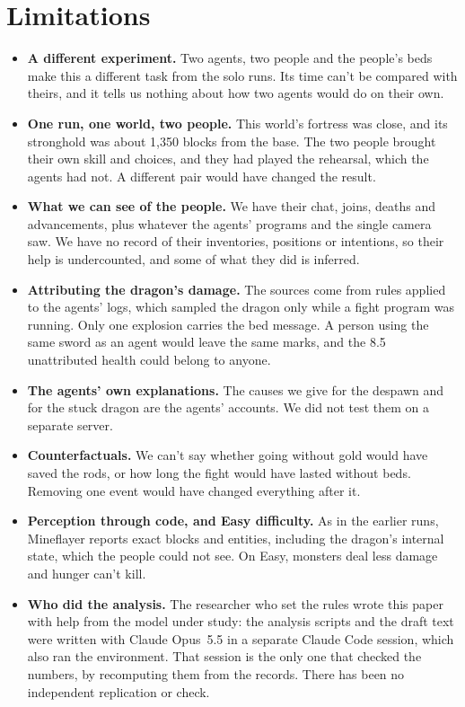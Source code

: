 \documentclass[11pt,a4paper]{article}
\begin{document}
\section{Limitations}
\label{sec:limits}

\begin{itemize}
  \item \textbf{A different experiment.} Two agents, two people and the people's beds make this a different task from the solo runs. Its time can't be compared with theirs, and it tells us nothing about how two agents would do on their own.
  \item \textbf{One run, one world, two people.} This world's fortress was close, and its stronghold was about 1,350 blocks from the base. The two people brought their own skill and choices, and they had played the rehearsal, which the agents had not. A different pair would have changed the result.
  \item \textbf{What we can see of the people.} We have their chat, joins, deaths and advancements, plus whatever the agents' programs and the single camera saw. We have no record of their inventories, positions or intentions, so their help is undercounted, and some of what they did is inferred.
  \item \textbf{Attributing the dragon's damage.} The sources come from rules applied to the agents' logs, which sampled the dragon only while a fight program was running. Only one explosion carries the bed message. A person using the same sword as an agent would leave the same marks, and the 8.5 unattributed health could belong to anyone.
  \item \textbf{The agents' own explanations.} The causes we give for the despawn and for the stuck dragon are the agents' accounts. We did not test them on a separate server.
  \item \textbf{Counterfactuals.} We can't say whether going without gold would have saved the rods, or how long the fight would have lasted without beds. Removing one event would have changed everything after it.
  \item \textbf{Perception through code, and Easy difficulty.} As in the earlier runs, Mineflayer reports exact blocks and entities, including the dragon's internal state, which the people could not see. On Easy, monsters deal less damage and hunger can't kill.
  \item \textbf{Who did the analysis.} The researcher who set the rules wrote this paper with help from the model under study: the analysis scripts and the draft text were written with Claude Opus~5.5 in a separate Claude Code session, which also ran the environment. That session is the only one that checked the numbers, by recomputing them from the records. There has been no independent replication or check.
\end{itemize}
\end{document}
